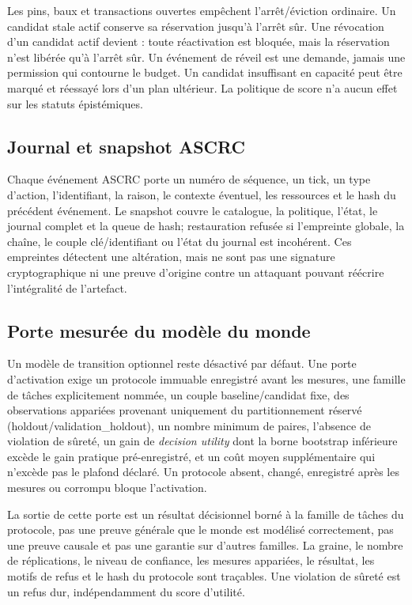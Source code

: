 \documentclass[10pt,a4paper]{article}
\newcommand{\code}[1]{\path{#1}}
\begin{document}
Les pins, baux et transactions ouvertes empêchent l'arrêt/éviction ordinaire. Un candidat stale actif conserve sa réservation jusqu'à l'arrêt sûr. Une révocation d'un candidat actif devient \code{revocation_pending}: toute réactivation est bloquée, mais la réservation n'est libérée qu'à l'arrêt sûr. Un événement de réveil est une demande, jamais une permission qui contourne le budget. Un candidat insuffisant en capacité peut être marqué \code{BLOCKED} et réessayé lors d'un plan ultérieur. La politique de score n'a aucun effet sur les statuts épistémiques.

\subsection{Journal et snapshot ASCRC}
Chaque événement ASCRC porte un numéro de séquence, un tick, un type d'action, l'identifiant, la raison, le contexte éventuel, les ressources et le hash du précédent événement. Le snapshot couvre le catalogue, la politique, l'état, le journal complet et la queue de hash; restauration refusée si l'empreinte globale, la chaîne, le couple clé/identifiant ou l'état du journal est incohérent. Ces empreintes détectent une altération, mais ne sont pas une signature cryptographique ni une preuve d'origine contre un attaquant pouvant réécrire l'intégralité de l'artefact.

\subsection{Porte mesurée du modèle du monde}
Un modèle de transition optionnel reste désactivé par défaut. Une porte d'activation exige un protocole immuable enregistré avant les mesures, une famille de tâches explicitement nommée, un couple baseline/candidat fixe, des observations appariées provenant uniquement du partitionnement réservé (holdout/validation\_holdout), un nombre minimum de paires, l'absence de violation de sûreté, un gain de \emph{decision utility} dont la borne bootstrap inférieure excède le gain pratique pré-enregistré, et un coût moyen supplémentaire qui n'excède pas le plafond déclaré. Un protocole absent, changé, enregistré après les mesures ou corrompu bloque l'activation.

La sortie de cette porte est un résultat décisionnel borné à la famille de tâches du protocole, pas une preuve générale que le monde est modélisé correctement, pas une preuve causale et pas une garantie sur d'autres familles. La graine, le nombre de réplications, le niveau de confiance, les mesures appariées, le résultat, les motifs de refus et le hash du protocole sont traçables. Une violation de sûreté est un refus dur, indépendamment du score d'utilité.
\end{document}

